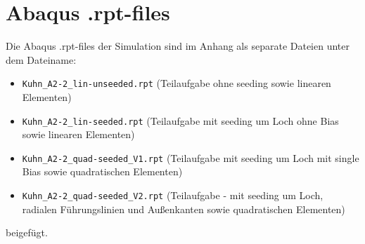 \section{Abaqus .rpt-files}
\label{sec:Abaqus .rpt-files}

Die Abaqus .rpt-files der Simulation sind im Anhang als separate Dateien unter dem Dateiname:
\begin{itemize}
    \item \verb+Kuhn_A2-2_lin-unseeded.rpt+ (Teilaufgabe  ohne seeding sowie linearen Elementen)
    \item \verb+Kuhn_A2-2_lin-seeded.rpt+ (Teilaufgabe  mit seeding um Loch ohne Bias sowie linearen Elementen)
    \item \verb+Kuhn_A2-2_quad-seeded_V1.rpt+ (Teilaufgabe  mit seeding um Loch mit single Bias sowie quadratischen Elementen)
    \item \verb+Kuhn_A2-2_quad-seeded_V2.rpt+ (Teilaufgabe  - mit seeding um Loch, radialen Führungslinien und Außenkanten sowie quadratischen Elementen)
\end{itemize}
beigefügt.